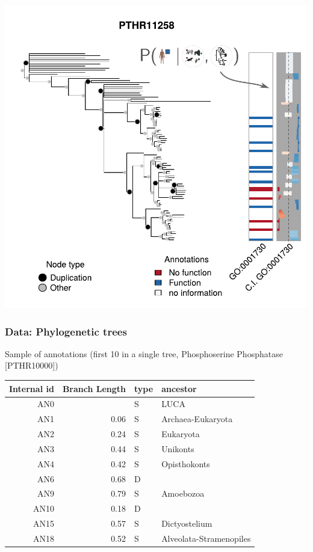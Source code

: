 \documentclass[aspectratio=169,9pt,handout]{beamer}
\begin{document}
\begin{frame}[t, label=aphylo-good]
\begin{minipage}[m]{.6\linewidth}
{			\includegraphics[width=.9\linewidth, clip, trim={0 0 0 2cm}]{example-trees-good1-parts-1b.pdf}
		}
	\end{minipage}
	\vfill	
	 \hfill\hyperlink{phylo-legend}{}
	
\end{frame}

\begin{frame}[label=aphylo-data]
	\frametitle{Data: Phylogenetic trees}
	
	Sample of annotations (first 10 in a single tree, Phosphoserine Phosphatase [PTHR10000])
	
	\small
	
	\begin{table}[ht]
		\centering
		\begin{tabular}{rrll}
			\toprule
			Internal id & Branch Length & type & ancestor \\ 
			\midrule
			AN0 &  & S & LUCA \\ 
			AN1 & 0.06 & S & Archaea-Eukaryota \\ 
			AN2 & 0.24 & S & Eukaryota \\ 
			AN3 & 0.44 & S & Unikonts \\ 
			AN4 & 0.42 & S & Opisthokonts \\ 
			AN6 & 0.68 & D &  \\ 
			AN9 & 0.79 & S & Amoebozoa \\ 
			AN10 & 0.18 & D &  \\ 
			AN15 & 0.57 & S & Dictyostelium \\ 
			AN18 & 0.52 & S & Alveolata-Stramenopiles \\ 
			\bottomrule
		\end{tabular}
	\end{table}
	\vfill\hfill\hyperlink{phylo-table}{}
\end{frame}
\end{document}
